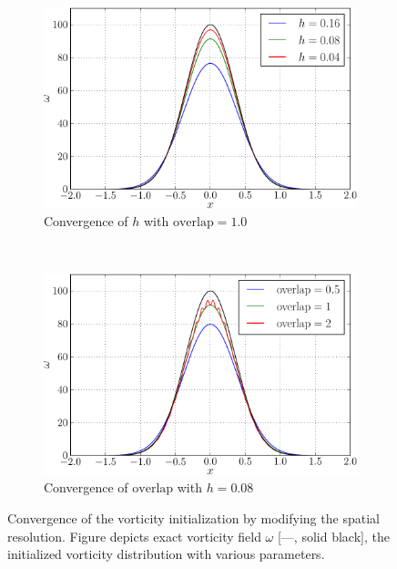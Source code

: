 \begin{figure}[t]
        \centering
        \begin{subfigure}[b]{0.5\textwidth}
                \includegraphics[width=\textwidth]{figures/lagrangian/betterInitialization_h-crop.pdf}
                \caption{Convergence of $h$ with $\mathrm{overlap} = 1.0$}
                \label{fig:convergenceOfBlobsH}
        \end{subfigure}%
        ~ %
        \begin{subfigure}[b]{0.5\textwidth}
                \includegraphics[width=\textwidth]{figures/lagrangian/betterInitialization_overlap-crop.pdf}
                \caption{Convergence of $\mathrm{overlap}$ with $h = 0.08$}
                \label{fig:convergenceOfBlobsOverlap}
        \end{subfigure}
        \caption{Convergence of the vorticity initialization by modifying the spatial resolution. Figure depicts exact vorticity field $\omega$ [---, solid black], the initialized vorticity distribution with various parameters.}
        \label{fig:convergenceOfSpatialResolution}
\end{figure}	

